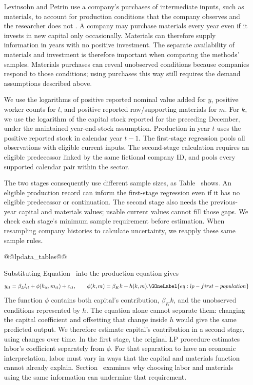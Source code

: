 Levinsohn and Petrin use a company's purchases of intermediate inputs, such as materials, to account for production conditions that the company observes and the researcher does not \citep{lp}. A company may purchase materials every year even if it invests in new capital only occasionally. Materials can therefore supply information in years with no positive investment. The separate availability of materials and investment is therefore important when comparing the methods' samples. Materials purchases can reveal unobserved conditions because companies respond to those conditions; using purchases this way still requires the demand assumptions described above.

We use the logarithms of positive reported nominal value added for $y$, positive worker counts for $l$, and positive reported raw/supporting materials for $m$. For $k$, we use the logarithm of the capital stock reported for the preceding December, under the maintained year-end-stock assumption. Production in year $t$ uses the positive reported stock in calendar year $t-1$. The first-stage regression pools all observations with eligible current inputs. The second-stage calculation requires an eligible predecessor linked by the same fictional company ID, and pools every supported calendar pair within the sector.

The two stages consequently use different sample sizes, as Table~ shows. An eligible production record can inform the first-stage regression even if it has no eligible predecessor or continuation. The second stage also needs the previous-year capital and materials values; usable current values cannot fill those gaps. We check each stage's minimum sample requirement before estimation. When resampling company histories to calculate uncertainty, we reapply these same sample rules.

@@lpdata_tables@@

Substituting Equation~ into the production equation gives
\begin{equation}
y_{it}=\beta_Ll_{it}+\phi(k_{it},m_{it})+\varepsilon_{it},\qquad
\phi(k,m)=\beta_Kk+h(k,m).
\GOneLabel{eq:lp-first-population}
\end{equation}
The function $\phi$ contains both capital's contribution, $\beta_Kk$, and the unobserved conditions represented by $h$. The equation alone cannot separate them: changing the capital coefficient and offsetting that change inside $h$ would give the same predicted output. We therefore estimate capital's contribution in a second stage, using changes over time. In the first stage, the original LP procedure estimates labor's coefficient separately from $\phi$. For that separation to have an economic interpretation, labor must vary in ways that the capital and materials function cannot already explain. Section~ examines why choosing labor and materials using the same information can undermine that requirement.

